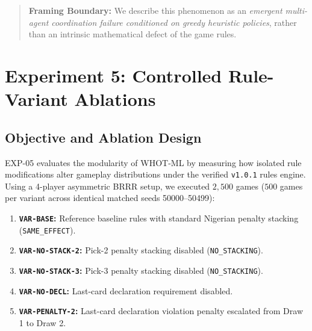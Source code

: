\documentclass[11pt]{article}
\begin{document}
\begin{quote}
\small \textbf{Framing Boundary:} We describe this phenomenon as an \textit{emergent multi-agent coordination failure conditioned on greedy heuristic policies}, rather than an intrinsic mathematical defect of the game rules.
\end{quote}


\section{Experiment 5: Controlled Rule-Variant Ablations}

\subsection{Objective and Ablation Design}
EXP-05 evaluates the modularity of WHOT-ML by measuring how isolated rule modifications alter gameplay distributions under the verified \texttt{v1.0.1} rules engine. Using a 4-player asymmetric BRRR setup, we executed $2,500$ games ($500$ games per variant across identical matched seeds 50000--50499):
\begin{enumerate}
  \item \textbf{\texttt{VAR-BASE}:} Reference baseline rules with standard Nigerian penalty stacking (\texttt{SAME\_EFFECT}).
  \item \textbf{\texttt{VAR-NO-STACK-2}:} Pick-2 penalty stacking disabled (\texttt{NO\_STACKING}).
  \item \textbf{\texttt{VAR-NO-STACK-3}:} Pick-3 penalty stacking disabled (\texttt{NO\_STACKING}).
  \item \textbf{\texttt{VAR-NO-DECL}:} Last-card declaration requirement disabled.
  \item \textbf{\texttt{VAR-PENALTY-2}:} Last-card declaration violation penalty escalated from Draw 1 to Draw 2.
\end{enumerate}
\end{document}
